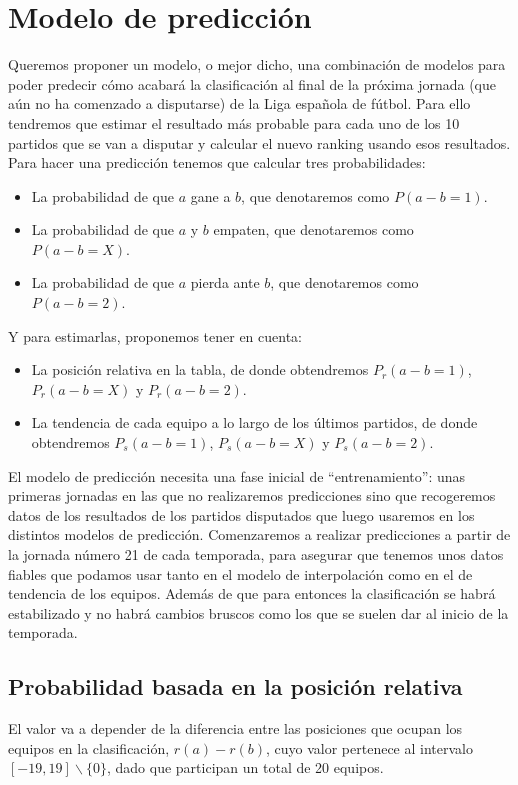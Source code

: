 \chapter{Modelo de predicción}
Queremos proponer un modelo, o mejor dicho, una combinación de modelos para poder predecir cómo acabará la clasificación al final de la próxima jornada (que aún no ha comenzado a disputarse) de la Liga española de fútbol. Para ello tendremos que estimar el resultado más probable para cada uno de los 10 partidos que se van a disputar y calcular el nuevo ranking usando esos resultados. \\

Para hacer una predicción tenemos que calcular tres probabilidades:
\begin{itemize}
	\item La probabilidad de que $a$ gane a $b$, que denotaremos como $P(a-b=1)$.
	\item La probabilidad de que $a$ y $b$ empaten, que denotaremos como $P(a-b=X)$.
	\item La probabilidad de que $a$ pierda ante $b$, que denotaremos como $P(a-b=2)$.
\end{itemize}
Y para estimarlas, proponemos tener en cuenta:
\begin{itemize}
	\item La posición relativa en la tabla, de donde obtendremos $P_{r}(a-b=1)$, $P_{r}(a-b=X)$ y $P_{r}(a-b=2)$.
	\item La tendencia de cada equipo a lo largo de los últimos partidos, de donde obtendremos $P_{s}(a-b=1)$, $P_{s}(a-b=X)$ y $P_{s}(a-b=2)$.
\end{itemize}

El modelo de predicción necesita una fase inicial de ``entrenamiento'': unas primeras jornadas en las que no realizaremos predicciones sino que recogeremos datos de los resultados de los partidos disputados que luego usaremos en los distintos modelos de predicción. Comenzaremos a realizar predicciones a partir de la jornada número 21 de cada temporada, para asegurar que tenemos unos datos fiables que podamos usar tanto en el modelo de interpolación como en el de tendencia de los equipos. Además de que para entonces la clasificación se habrá estabilizado y no habrá cambios bruscos como los que se suelen dar al inicio de la temporada.

\section{Probabilidad basada en la posición relativa}
El valor va a depender de la diferencia entre las posiciones que ocupan los equipos en la clasificación, $r(a)-r(b)$, cuyo valor pertenece al intervalo $[-19,19] \backslash \{0\}$, dado que participan un total de 20 equipos.\\

